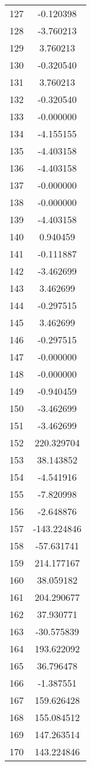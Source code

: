 \documentclass[12pt]{article}
\begin{document}
\begin{longtable}{@{}cc@{}}
127 & -0.120398 \\
128 & -3.760213 \\
129 & 3.760213 \\
130 & -0.320540 \\
131 & 3.760213 \\
132 & -0.320540 \\
133 & -0.000000 \\
134 & -4.155155 \\
135 & -4.403158 \\
136 & -4.403158 \\
137 & -0.000000 \\
138 & -0.000000 \\
139 & -4.403158 \\
140 & 0.940459 \\
141 & -0.111887 \\
142 & -3.462699 \\
143 & 3.462699 \\
144 & -0.297515 \\
145 & 3.462699 \\
146 & -0.297515 \\
147 & -0.000000 \\
148 & -0.000000 \\
149 & -0.940459 \\
150 & -3.462699 \\
151 & -3.462699 \\
152 & 220.329704 \\
153 & 38.143852 \\
154 & -4.541916 \\
155 & -7.820998 \\
156 & -2.648876 \\
157 & -143.224846 \\
158 & -57.631741 \\
159 & 214.177167 \\
160 & 38.059182 \\
161 & 204.290677 \\
162 & 37.930771 \\
163 & -30.575839 \\
164 & 193.622092 \\
165 & 36.796478 \\
166 & -1.387551 \\
167 & 159.626428 \\
168 & 155.084512 \\
169 & 147.263514 \\
170 & 143.224846 \\

\end{longtable}
\end{document}
